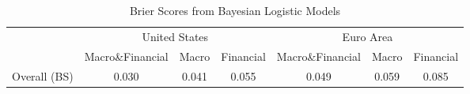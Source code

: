 \begin{table}[ht]
\centering
\caption{Brier Scores from Bayesian Logistic Models}
\label{tab:brier_scores}
\begin{tabular}{lccc|ccc}
 & \multicolumn{3}{c|}{United States} & \multicolumn{3}{c}{Euro Area} \\
 & Macro\&Financial & Macro & Financial & Macro\&Financial & Macro & Financial \\
Overall (BS) & 0.030 & 0.041 & 0.055 & 0.049 & 0.059 & 0.085 \\
\end{tabular}
\\[1ex]

\end{table}